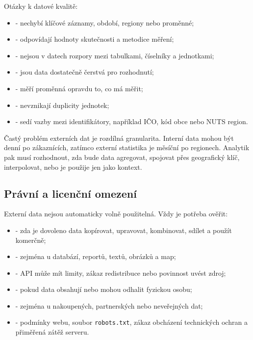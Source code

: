 Otázky k datové kvalitě:
\begin{itemize}
  \item {} - nechybí klíčové záznamy, období, regiony nebo proměnné;
  \item {} - odpovídají hodnoty skutečnosti a metodice měření;
  \item {} - nejsou v datech rozpory mezi tabulkami, číselníky a jednotkami;
  \item {} - jsou data dostatečně čerstvá pro rozhodnutí;
  \item {} - měří proměnná opravdu to, co má měřit;
  \item {} - nevznikají duplicity jednotek;
  \item {} - sedí vazby mezi identifikátory, například IČO, kód obce nebo NUTS region.
\end{itemize}

Častý problém externích dat je rozdílná granularita. Interní data mohou být denní po zákaznících,
zatímco externí statistika je měsíční po regionech. Analytik pak musí rozhodnout, zda bude data
agregovat, spojovat přes geografický klíč, interpolovat, nebo je použije jen jako kontext.

\subsection{Právní a licenční omezení}
Externí data nejsou automaticky volně použitelná. Vždy je potřeba ověřit:
\begin{itemize}
  \item {} - zda je dovoleno data kopírovat, upravovat, kombinovat, sdílet a použít
  komerčně;
  \item {} - zejména u databází, reportů, textů, obrázků a map;
  \item {} - API může mít limity, zákaz redistribuce nebo povinnost uvést zdroj;
  \item {} - pokud data obsahují nebo mohou odhalit fyzickou osobu;
  \item {} - zejména u nakoupených, partnerských nebo neveřejných dat;
  \item {} - podmínky webu, soubor \texttt{robots.txt}, zákaz obcházení
  technických ochran a přiměřená zátěž serveru.
\end{itemize}

